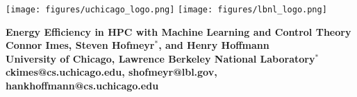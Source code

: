 \documentclass[a0,portrait]{a0poster}
\begin{document}

\begin{minipage}[b]{\linewidth}
\begin{center}
\texttt{[image: figures/uchicago\_logo.png]} %
\hspace{42cm}
\texttt{[image: figures/lbnl\_logo.png]}\\
\vspace{0.25cm}
\noindent\makebox[\linewidth]{\rule{0.9\paperwidth}{0.4pt}}
\vspace{0.25cm}
\end{center}

\Huge \color{NavyBlue} \textbf{Energy Efficiency in HPC with Machine Learning and Control Theory} \color{Black}\\[0.5cm] %
\huge \textbf{Connor Imes, Steven Hofmeyr$^*$, and Henry Hoffmann}\\[0.25cm] %
\LARGE \textbf{University of Chicago, Lawrence Berkeley National Laboratory$^*$}\\ %
\Large \textbf{ckimes@cs.uchicago.edu, shofmeyr@lbl.gov, hankhoffmann@cs.uchicago.edu}
\end{minipage}
%


\end{document}
